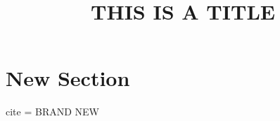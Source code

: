 \documentclass{article}
\begin{document}
\title{THIS IS A TITLE}
\maketitle
\section{New Section}

cite = \cite{DEK5} BRAND NEW 
\cite{DEK4}
\cite{DEK1}
\cite{DEK6}



\end{document}
